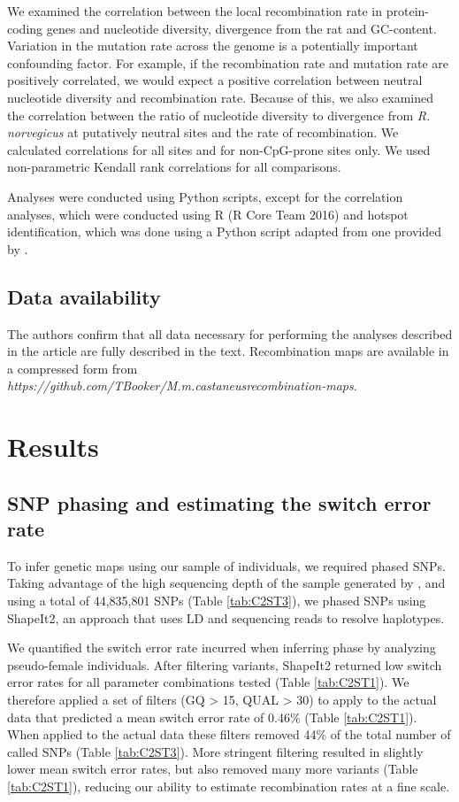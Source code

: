 We examined the correlation between the local recombination rate in protein-coding genes and nucleotide diversity, divergence from the rat and GC-content. Variation in the mutation rate across the genome is a potentially important confounding factor. For example, if the recombination rate and mutation rate are positively correlated, we would expect a positive correlation between neutral nucleotide diversity and recombination rate. Because of this, we also examined the correlation between the ratio of nucleotide diversity to divergence from \textit{R. norvegicus} at putatively neutral sites and the rate of recombination. We calculated correlations for all sites and for non-CpG-prone sites only. We used non-parametric Kendall rank correlations for all comparisons.

Analyses were conducted using Python scripts, except for the correlation analyses, which were conducted using R (R Core Team 2016) and hotspot identification, which was done using a Python script adapted from one provided by \cite{RN258}. 

\subsection{Data availability}

	The authors confirm that all data necessary for performing the analyses described in the article are fully described in the text. Recombination maps are available in a compressed form from \textit{https://github.com/TBooker/M.m.castaneus\textunderscore recombination-maps}.

\section{Results}
 
\subsection{SNP phasing and estimating the switch error rate}
 
To infer genetic maps using our sample of individuals, we required phased SNPs. Taking advantage of the high sequencing depth of the sample generated by \cite{RN122}, and using a total of 44,835,801 SNPs (Table \ref{tab:C2ST3}), we phased SNPs using ShapeIt2, an approach that uses LD and sequencing reads to resolve haplotypes. 
 
We quantified the switch error rate incurred when inferring phase by analyzing pseudo-female individuals. After filtering variants, ShapeIt2 returned low switch error rates for all parameter combinations tested (Table \ref{tab:C2ST1}). We therefore applied a set of filters (GQ > 15, QUAL > 30) to apply to the actual data that predicted a mean switch error rate of 0.46\% (Table \ref{tab:C2ST1}). When applied to the actual data these filters removed 44\% of the total number of called SNPs (Table \ref{tab:C2ST3}). More stringent filtering resulted in slightly lower mean switch error rates, but also removed many more variants (Table \ref{tab:C2ST1}), reducing our ability to estimate recombination rates at a fine scale.
 
